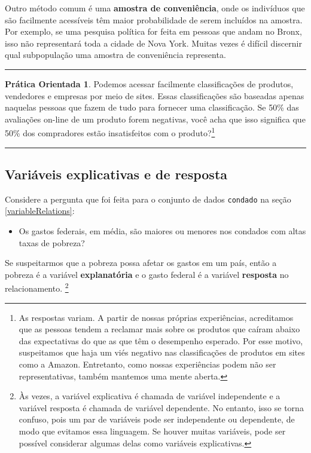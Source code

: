\documentclass[
]{book}
\providecommand{\tightlist}{%
  \setlength{\itemsep}{0pt}\setlength{\parskip}{0pt}}
\theoremstyle{definition}
\theoremstyle{definition}
\theoremstyle{definition}
\newtheorem{exercise}{Prática Orientada}[chapter]
\theoremstyle{definition}
\theoremstyle{remark}
\begin{document}
Outro método comum é uma \textbf{amostra de conveniência}, onde os indivíduos que são facilmente acessíveis têm maior probabilidade de serem incluídos na amostra. Por exemplo, se uma pesquisa política for feita em pessoas que andam no Bronx, isso não representará toda a cidade de Nova York. Muitas vezes é difícil discernir qual subpopulação uma amostra de conveniência representa.

\begin{center}\rule{0.5\linewidth}{0.5pt}\end{center}

\begin{exercise}
\protect\hypertarget{exr:unnamed-chunk-9}{}{\label{exr:unnamed-chunk-9} }Podemos acessar facilmente classificações de produtos, vendedores e empresas por meio de sites. Essas classificações são baseadas apenas naquelas pessoas que fazem de tudo para fornecer uma classificação. Se 50\% das avaliações on-line de um produto forem negativas, você acha que isso significa que 50\% dos compradores estão insatisfeitos com o produto?\footnote{As respostas variam. A partir de nossas próprias experiências, acreditamos que as pessoas tendem a reclamar mais sobre os produtos que caíram abaixo das expectativas do que as que têm o desempenho esperado. Por esse motivo, suspeitamos que haja um viés negativo nas classificações de produtos em sites como a Amazon. Entretanto, como nossas experiências podem não ser representativas, também mantemos uma mente aberta.}
\end{exercise}

\begin{center}\rule{0.5\linewidth}{0.5pt}\end{center}

\hypertarget{explanatoryAndResponse}{%
\subsection{Variáveis explicativas e de resposta}\label{explanatoryAndResponse}}

Considere a pergunta que foi feita para o conjunto de dados \texttt{condado} na seção \ref{variableRelations}:

\begin{itemize}
\tightlist
\item
  Os gastos federais, em média, são maiores ou menores nos condados com altas taxas de pobreza?
\end{itemize}

Se suspeitarmos que a pobreza possa afetar os gastos em um país, então a pobreza é a variável \textbf{explanatória} e o gasto federal é a variável \textbf{resposta} no relacionamento. \footnote{Às vezes, a variável explicativa é chamada de variável independente e a variável resposta é chamada de variável dependente. No entanto, isso se torna confuso, pois um par de variáveis pode ser independente ou dependente, de modo que evitamos essa linguagem. Se houver muitas variáveis, pode ser possível considerar algumas delas como variáveis explicativas.}
\end{document}
